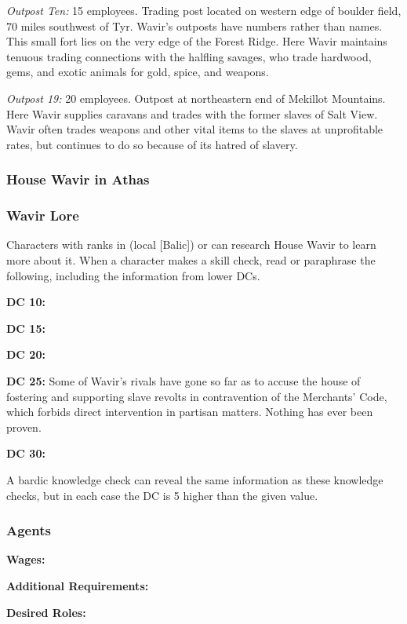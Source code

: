 \textit{Outpost Ten:} 15 employees. Trading post located on western edge of boulder field, 70 miles southwest of Tyr. Wavir's outposts have numbers rather than names. This small fort lies on the very edge of the Forest Ridge. Here Wavir maintains tenuous trading connections with the halfling savages, who trade hardwood, gems, and exotic animals for gold, spice, and weapons.

\textit{Outpost 19:} 20 employees. Outpost at northeastern end of Mekillot Mountains. Here Wavir supplies caravans and trades with the former slaves of Salt View. Wavir often trades weapons and other vital items to the slaves at unprofitable rates, but continues to do so because of its hatred of slavery.

\subsubsection{House Wavir in Athas}

\subsubsection{Wavir Lore}
Characters with ranks in  (local [Balic]) or  can research House Wavir to learn more about it. When a character makes a skill check, read or paraphrase the following, including the information from lower DCs.

\textbf{DC 10:}

\textbf{DC 15:}

\textbf{DC 20:}

\textbf{DC 25:} Some of Wavir's rivals have gone so far as to accuse the house of fostering and supporting slave revolts in contravention of the Merchants' Code, which forbids direct intervention in partisan matters. Nothing has ever been proven.

\textbf{DC 30:}

A bardic knowledge check can reveal the same information as these knowledge checks, but in each case the DC is 5 higher than the given value.

\subsubsection{Agents}


\textbf{Wages:}

\textbf{Additional Requirements:}

\textbf{Desired Roles:}